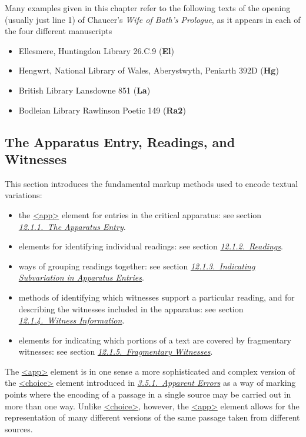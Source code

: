 Many examples given in this chapter refer to the following texts of the opening (usually just line 1) of Chaucer's \textit{Wife of Bath's Prologue}, as it appears in each of the four different manuscripts \begin{itemize}
\item Ellesmere, Huntingdon Library 26.C.9 (\textbf{El}) 
\item Hengwrt, National Library of Wales, Aberystwyth, Peniarth 392D (\textbf{Hg}) 
\item British Library Lansdowne 851 (\textbf{La}) 
\item Bodleian Library Rawlinson Poetic 149 (\textbf{Ra2}) 
\end{itemize} 
\subsection[{The Apparatus Entry, Readings, and Witnesses}]{The Apparatus Entry, Readings, and Witnesses}\label{TCAPLL}\par
This section introduces the fundamental markup methods used to encode textual variations: \begin{itemize}
\item the \hyperref[TEI.app]{<app>} element for entries in the critical apparatus: see section \textit{\hyperref[TCAPEN]{12.1.1.\ The Apparatus Entry}}.
\item elements for identifying individual readings: see section \textit{\hyperref[TCAPLR]{12.1.2.\ Readings}}.
\item ways of grouping readings together: see section \textit{\hyperref[TCAPSU]{12.1.3.\ Indicating Subvariation in Apparatus Entries}}.
\item methods of identifying which witnesses support a particular reading, and for describing the witnesses included in the apparatus: see section \textit{\hyperref[TCAPLW]{12.1.4.\ Witness Information}}.
\item elements for indicating which portions of a text are covered by fragmentary witnesses: see section \textit{\hyperref[TCAPMI]{12.1.5.\ Fragmentary Witnesses}}.
\end{itemize} \par
The \hyperref[TEI.app]{<app>} element is in one sense a more sophisticated and complex version of the \hyperref[TEI.choice]{<choice>} element introduced in \textit{\hyperref[COEDCOR]{3.5.1.\ Apparent Errors}} as a way of marking points where the encoding of a passage in a single source may be carried out in more than one way. Unlike \hyperref[TEI.choice]{<choice>}, however, the \hyperref[TEI.app]{<app>} element allows for the representation of many different versions of the same passage taken from different sources.
